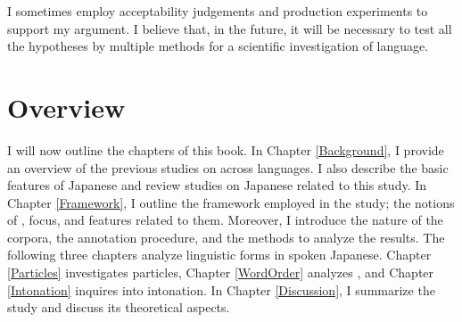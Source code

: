 I sometimes employ acceptability judgements and production experiments
to support my argument.
I believe that, in the future,
it will be necessary to test all the hypotheses by multiple methods
for a scientific investigation of language.


\section{Overview}\label{IntroOverview}

I will now outline the chapters of this book.
In Chapter \ref{Background},
I provide an overview of the previous studies on  across languages.
I also describe the basic features of Japanese and review studies on Japanese related to this study.
In Chapter \ref{Framework},
I outline the framework employed in the study;
the notions of , focus, and features related to them.
Moreover, I introduce the nature of the corpora,
the annotation procedure, and the methods to analyze the results.
The following three chapters analyze linguistic forms in spoken Japanese.
Chapter \ref{Particles} investigates particles,
Chapter \ref{WordOrder} analyzes , and
Chapter \ref{Intonation} inquires into intonation.
In Chapter \ref{Discussion},
I summarize the study and discuss its theoretical aspects.

















